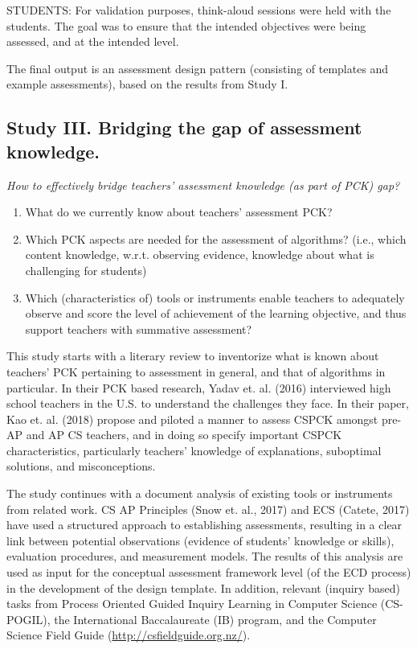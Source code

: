 STUDENTS:
For validation purposes, think-aloud sessions were held with the students. The goal was to ensure that the intended objectives were being assessed, and at the intended level.



The final output is an assessment design pattern (consisting of templates and example assessments), based on the results from Study I.


\subsection{Study III. Bridging the gap of assessment knowledge.}
\textit{How to effectively bridge teachers' assessment knowledge (as part of PCK) gap?}

\begin{enumerate}
\item What do we currently know about teachers' assessment PCK?
\item Which PCK aspects are needed for the assessment of algorithms? (i.e., which content knowledge, w.r.t. observing evidence, knowledge about what is challenging for students)
\item Which (characteristics of) tools or instruments enable teachers to adequately observe and score the level of achievement of the learning objective, and thus support teachers with summative assessment?
\end{enumerate}

This study starts with a literary review to inventorize what is known about teachers' PCK pertaining to assessment in general, and that of algorithms in particular. In their PCK based research, Yadav et. al. (2016) interviewed high school teachers in the U.S. to understand the challenges they face. In their paper, Kao et. al. (2018) propose and piloted a manner to assess CSPCK amongst pre-AP and AP CS teachers, and in doing so specify important CSPCK characteristics, particularly teachers' knowledge of explanations, suboptimal solutions, and misconceptions.



The study continues with a document analysis of existing tools or instruments from related work. CS AP Principles (Snow et. al., 2017) and ECS (Catete, 2017) have used a structured approach to establishing assessments, resulting in a clear link between potential observations (evidence of students' knowledge or skills), evaluation procedures, and measurement models. The results of this analysis are used as input for the conceptual assessment framework level (of the ECD process) in the development of the design template. In addition, relevant (inquiry based) tasks from Process Oriented Guided Inquiry Learning in Computer Science (CS-POGIL), the International Baccalaureate (IB) program, and the Computer Science Field Guide (\url{http://csfieldguide.org.nz/}).



